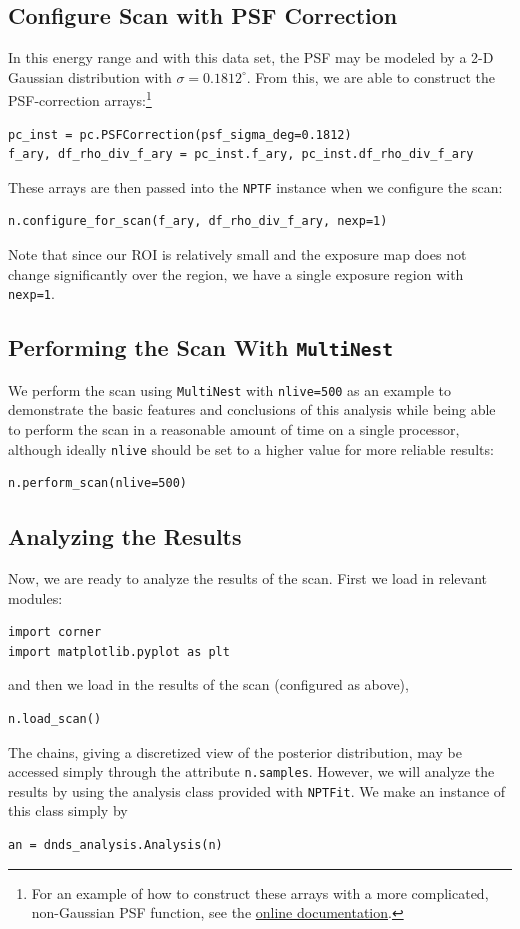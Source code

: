\subsection{Configure Scan with PSF Correction}
In this energy range and with this data set, the PSF may be modeled by a 2-D Gaussian distribution with $\sigma = 0.1812^\circ$.  From this, we are able to construct the PSF-correction arrays:\footnote{For an example of how to construct these arrays with a more complicated, non-Gaussian PSF function, see the \href{http://nptfit.readthedocs.io}{online documentation}.} 
\begin{lstlisting}
pc_inst = pc.PSFCorrection(psf_sigma_deg=0.1812)
f_ary, df_rho_div_f_ary = pc_inst.f_ary, pc_inst.df_rho_div_f_ary
\end{lstlisting}
These arrays are then passed into the \lstinline{NPTF} instance when we configure the scan:
\begin{lstlisting}
n.configure_for_scan(f_ary, df_rho_div_f_ary, nexp=1)
\end{lstlisting}
Note that since our ROI is relatively small and the exposure map does not change significantly over the region, we have a single exposure region with \lstinline{nexp=1}.

\subsection{Performing the Scan With \texttt{MultiNest}}
We perform the scan using \texttt{MultiNest} with \lstinline{nlive=500} as an example to demonstrate the basic features and conclusions of this analysis while being able to perform the scan in a reasonable amount of time on a single processor, although ideally \lstinline{nlive} should be set to a higher value for more reliable results:
\begin{lstlisting}
n.perform_scan(nlive=500)
\end{lstlisting}

\subsection{Analyzing the Results}
Now, we are ready to analyze the results of the scan.  First we load in relevant modules:
\begin{lstlisting}
import corner
import matplotlib.pyplot as plt
\end{lstlisting}
and then we load in the results of the scan (configured as above),
\begin{lstlisting}
n.load_scan()
\end{lstlisting}
The chains, giving a discretized view of the posterior distribution, may be accessed simply through the attribute \lstinline{n.samples}.  However, we will analyze the results by using the analysis class provided with \texttt{NPTFit}.  We make an instance of this class simply by
\begin{lstlisting}
an = dnds_analysis.Analysis(n)
\end{lstlisting}

